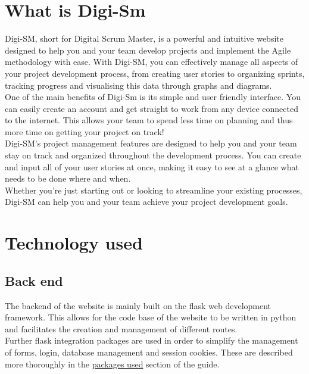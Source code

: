 \documentclass{article}
\begin{document}

\section{What is Digi-Sm}

Digi-SM, short for Digital Scrum Master, is a powerful and intuitive website designed to help you and your team develop projects and implement the Agile methodology with ease. With Digi-SM, you can effectively manage all aspects of your project development process, from creating user stories to organizing sprints, tracking progress and visualising this data through graphs and diagrams.\\

\noindent One of the main benefits of Digi-Sm is its simple and user friendly interface. You can easily create an account and get straight to work from any device connected to the internet. This allows your team to spend less time on planning and thus more time on getting your project on track! \\

\noindent Digi-SM's project management features are designed to help you and your team stay on track and organized throughout the development process. You can create and input all of your user stories at once, making it easy to see at a glance what needs to be done where and when.\\

\noindent Whether you're just starting out or looking to streamline your existing processes, Digi-SM can help you and your team achieve your project development goals.\\



\section{Technology used}

\subsection{Back end}

The backend of the website is mainly built on the flask web development framework.
This allows for the code base of the website to be written in python and facilitates the creation and management of different routes.
\\
Further flask integration packages are used in order to simplify the management of forms, login, database management and session cookies. These are described more thoroughly in the \hyperref[packages used]{packages used} section of the guide.
\end{document}
